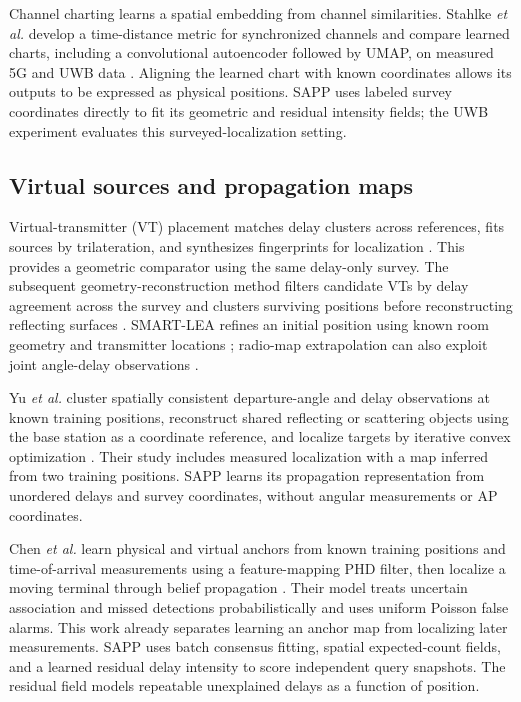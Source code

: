\documentclass[conference]{IEEEtran}
\begin{document}
Channel charting learns a spatial embedding from channel similarities. Stahlke \emph{et al.} develop a time-distance metric for synchronized channels and compare learned charts, including a convolutional autoencoder followed by UMAP, on measured 5G and UWB data \cite{stahlke2023charting}. Aligning the learned chart with known coordinates allows its outputs to be expressed as physical positions. SAPP uses labeled survey coordinates directly to fit its geometric and residual intensity fields; the UWB experiment evaluates this surveyed-localization setting.

\subsection{Virtual sources and propagation maps}
Virtual-transmitter (VT) placement matches delay clusters across references, fits sources by trilateration, and synthesizes fingerprints for localization \cite{zayets2018interpolation}. This provides a geometric comparator using the same delay-only survey. The subsequent geometry-reconstruction method filters candidate VTs by delay agreement across the survey and clusters surviving positions before reconstructing reflecting surfaces \cite{zayets2019reconstruction}. SMART-LEA refines an initial position using known room geometry and transmitter locations \cite{abdmoulah2026smartlea}; radio-map extrapolation can also exploit joint angle-delay observations \cite{li2023radiomap}.

Yu \emph{et al.} cluster spatially consistent departure-angle and delay observations at known training positions, reconstruct shared reflecting or scattering objects using the base station as a coordinate reference, and localize targets by iterative convex optimization \cite{yu2026spatialconsistency}. Their study includes measured localization with a map inferred from two training positions. SAPP learns its propagation representation from unordered delays and survey coordinates, without angular measurements or AP coordinates.

Chen \emph{et al.} learn physical and virtual anchors from known training positions and time-of-arrival measurements using a feature-mapping PHD filter, then localize a moving terminal through belief propagation \cite{chen2022unsimultaneous}. Their model treats uncertain association and missed detections probabilistically and uses uniform Poisson false alarms. This work already separates learning an anchor map from localizing later measurements. SAPP uses batch consensus fitting, spatial expected-count fields, and a learned residual delay intensity to score independent query snapshots. The residual field models repeatable unexplained delays as a function of position.
\end{document}
